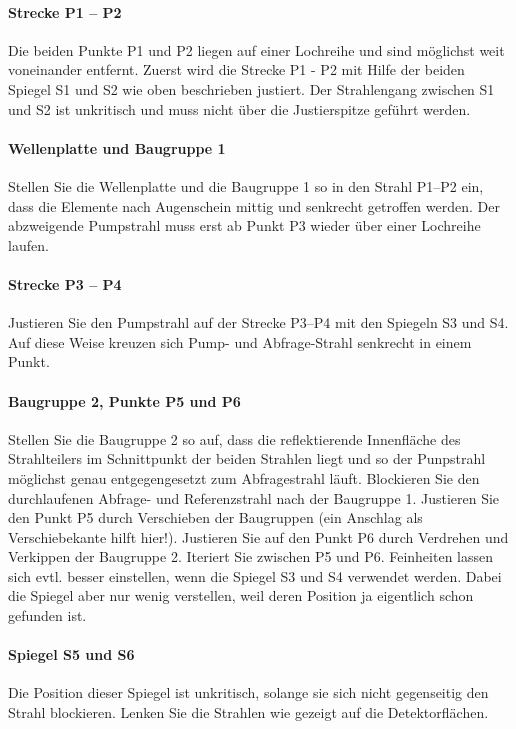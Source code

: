 \paragraph{Strecke P1 -- P2} Die beiden Punkte P1 und P2 liegen auf einer Lochreihe und sind möglichst weit voneinander entfernt. Zuerst wird die Strecke P1 - P2 mit Hilfe der beiden Spiegel S1 und S2 wie oben beschrieben justiert. Der Strahlengang zwischen S1 und S2 ist unkritisch und muss nicht über die Justierspitze geführt werden. 

\paragraph{Wellenplatte und Baugruppe 1}  Stellen Sie die Wellenplatte und die Baugruppe 1 so in den Strahl P1--P2 ein, dass die Elemente nach Augenschein mittig und senkrecht getroffen werden.  Der abzweigende Pumpstrahl muss erst ab Punkt P3 wieder über einer Lochreihe laufen.

\paragraph{Strecke P3 -- P4} Justieren Sie den Pumpstrahl auf der Strecke P3--P4 mit den Spiegeln S3 und S4. Auf diese Weise kreuzen sich Pump- und Abfrage-Strahl senkrecht in einem Punkt.

\paragraph{Baugruppe 2, Punkte P5 und P6}  Stellen Sie  die Baugruppe 2 so auf, dass die reflektierende Innenfläche des Strahlteilers im Schnittpunkt der beiden Strahlen liegt und so der Punpstrahl möglichst genau entgegengesetzt zum  Abfragestrahl läuft. Blockieren Sie den durchlaufenen Abfrage- und Referenzstrahl nach der Baugruppe 1. Justieren Sie den Punkt P5 durch Verschieben der Baugruppen (ein Anschlag als Verschiebekante hilft hier!). Justieren Sie auf den Punkt P6 durch Verdrehen und Verkippen der Baugruppe 2. Iteriert Sie zwischen P5 und P6. Feinheiten lassen sich evtl. besser einstellen, wenn die Spiegel S3 und S4 verwendet werden. Dabei die Spiegel aber nur wenig verstellen, weil deren Position ja eigentlich schon gefunden ist.


\paragraph{Spiegel S5 und S6} Die Position dieser Spiegel ist unkritisch, solange sie sich nicht gegenseitig den Strahl blockieren. Lenken Sie die Strahlen wie gezeigt auf die  Detektorflächen.

